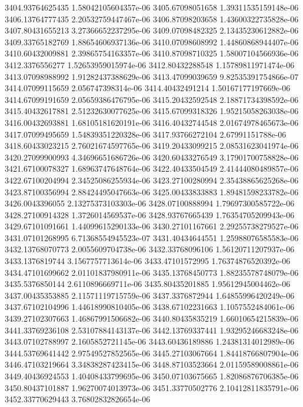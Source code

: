 {3404.93764625435 1.58042105604357e-06
3405.67098051658 1.39311535159148e-06
3406.13764777435 2.20532759447467e-06
3406.87098203658 1.43600322735828e-06
3407.80431655213 3.27366652237295e-06
3409.07098482325 2.13435230612882e-06
3409.33765182769 1.88654606937136e-06
3410.07098608992 1.44860868944407e-06
3410.60432009881 2.39865754163357e-06
3410.87098710325 1.58007104566936e-06
3412.3376556277 1.52653959015974e-06
3412.80432288548 1.15789811971474e-06
3413.07098988992 1.91282437388629e-06
3413.47099039659 9.82535391754866e-07
3414.07099115659 2.056747398314e-06
3414.40432491214 1.50167177197669e-06
3414.67099191659 2.05659386476795e-06
3415.20432592548 2.18871734398592e-06
3415.40432617881 2.51232630077625e-06
3415.67099318326 1.95215058263038e-06
3416.00432693881 1.68105181620191e-06
3416.40432744548 2.01674978465673e-06
3417.07099495659 1.54839351220328e-06
3417.93766272104 2.67991151788e-06
3418.60433023215 2.76021674597765e-06
3419.20433099215 2.08531623041974e-06
3420.27099900993 4.34696651686726e-06
3420.60433276549 3.17901700758828e-06
3421.67100078327 1.68963747648764e-06
3422.40433504549 2.41444080489857e-06
3422.67100204994 2.34525086255934e-06
3423.27100280994 2.35438865625268e-06
3423.87100356994 2.88424495047663e-06
3425.00433833883 1.89481598233782e-06
3426.0043396055 2.13275373103303e-06
3428.07100888994 1.79697300585722e-06
3428.27100914328 1.3726014569537e-06
3428.93767665439 1.76354705209943e-06
3429.67101091661 1.44099615290133e-06
3430.27101167661 2.29255738279527e-06
3431.07101268995 6.71368554945523e-07
3431.40434644551 1.25988076585583e-06
3432.13768070773 2.0055609704738e-06
3432.33768096106 1.56120711207937e-06
3433.1376819744 3.1567757713614e-06
3433.47101572995 1.76374876520392e-06
3434.47101699662 2.01101837980911e-06
3435.13768450773 1.88235578748079e-06
3435.5376850144 2.6110896669711e-06
3435.80435201885 1.95612945004462e-06
3437.00435353885 2.11571119715759e-06
3437.3376872944 1.64855996420249e-06
3437.67102104996 1.44618990810405e-06
3438.67102231663 1.1057552484061e-06
3439.27102307663 1.46867991506682e-06
3440.80435835219 1.66010654215839e-06
3441.33769236108 2.53107884143137e-06
3442.13769337441 1.93295246683248e-06
3443.07102788997 2.1605852721145e-06
3443.60436189886 1.24381314012989e-06
3444.53769641442 2.97549527852565e-06
3445.27103067664 1.84418766807904e-06
3446.47103219664 3.34838287423415e-06
3448.87103523664 2.01159589008861e-06
3449.40436924553 1.40408433799695e-06
3450.07103675665 1.82086876706385e-06
3450.80437101887 1.96270074013973e-06
3451.33770502776 2.10412811835791e-06
3452.33770629443 3.76802832826654e-06
}
